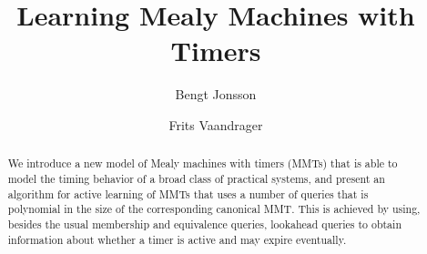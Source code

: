 \documentclass[sigplan,9pt]{acmart}
\newif\ifshort
\begin{document}
\title{Learning Mealy Machines with Timers}
\author{Bengt Jonsson}
\author{Frits Vaandrager}


\ifshort
\vspace{-2em}
\fi
\begin{abstract}
We introduce a new model of Mealy machines with timers (MMTs) that is able to model the timing behavior of a broad class of practical systems, and present an algorithm for active learning of MMTs that uses a
number of queries that is polynomial in the size of the corresponding canonical MMT. This is achieved by using, besides the usual membership and equivalence queries, 
lookahead queries to obtain information about whether a timer is active and may expire eventually.
\end{abstract}

\maketitle






%





\end{document}
